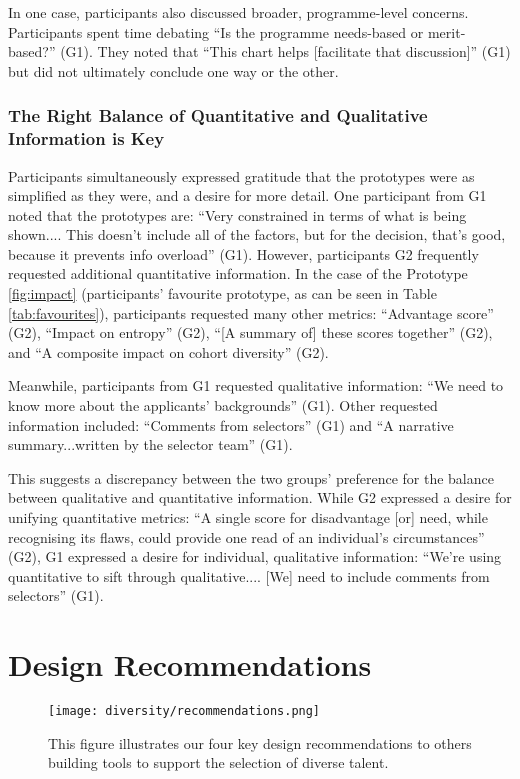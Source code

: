 In one case, participants also discussed broader, programme-level concerns. Participants spent time debating ``Is the programme needs-based or merit-based?'' (G1). They noted that ``This chart helps [facilitate that discussion]'' (G1) but did not ultimately conclude one way or the other.

\subsubsection{The Right Balance of Quantitative and Qualitative Information is Key}
Participants simultaneously expressed gratitude that the prototypes were as simplified as they were, and a desire for more detail. One participant from G1 noted that the prototypes are: ``Very constrained in terms of what is being shown.... This doesn't include all of the factors, but for the decision, that's good, because it prevents info overload'' (G1). However, participants G2 frequently requested additional quantitative information. In the case of the Prototype \ref{fig:impact} (participants' favourite prototype, as can be seen in Table \ref{tab:favourites}), participants requested many other metrics: ``Advantage score'' (G2), ``Impact on entropy'' (G2), ``[A summary of] these scores together'' (G2), and ``A composite impact on cohort diversity'' (G2).

Meanwhile, participants from G1 requested qualitative information: ``We need to know more about the applicants' backgrounds'' (G1). Other requested information included: ``Comments from selectors'' (G1) and ``A narrative summary...written by the selector team'' (G1). 

This suggests a discrepancy between the two groups' preference for the balance between qualitative and quantitative information. While G2 expressed a desire for unifying quantitative metrics: ``A single score for disadvantage [or] need, while recognising its flaws, could provide one read of an individual's circumstances'' (G2), G1 expressed a desire for individual, qualitative information: ``We're using quantitative to sift through qualitative.... [We] need to include comments from selectors'' (G1).


\section{Design Recommendations}
\begin{figure}[htbp]
    \centering
    \texttt{[image: diversity/recommendations.png]}
    \caption{This figure illustrates our four key design recommendations to others building tools to support the selection of diverse talent.}
    \label{fig:recommendations}
\end{figure}

